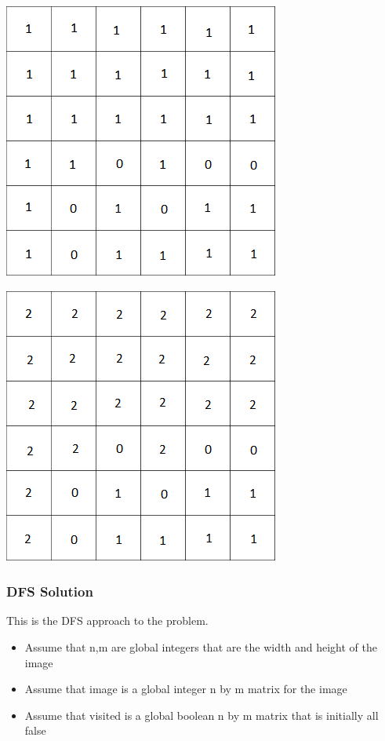 \documentclass[11pt,oneside]{book}
\makeatletter
\def\maxwidth#1{\ifdim\Gin@nat@width>#1 #1\else\Gin@nat@width\fi}
\makeatother
\begin{document}
\vspace{5px}\includegraphics[width=\maxwidth{\textwidth}]{bucket3.png}

\vspace{5px}\includegraphics[width=\maxwidth{\textwidth}]{bucket4.png}

\subsubsection{DFS Solution}

This is the DFS approach to the problem.

\begin{itemize}
\item Assume that n,m are global integers that are the width and height of the image
\item Assume that image is a global integer n by m matrix for the image
\item Assume that visited is a global boolean n by m matrix that is initially all false
\end{itemize}
\end{document}
